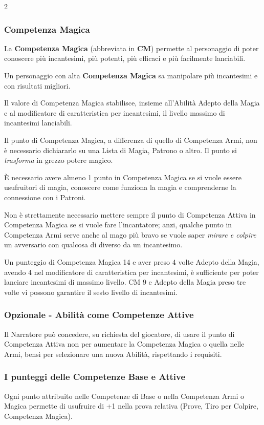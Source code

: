 \begin{multicols}{2}
\subsubsection{Competenza Magica}\label{competenzamagica}

La \textbf{Competenza Magica} (abbreviata in \textbf{CM}) permette al personaggio di poter conoscere più incantesimi, più potenti, più efficaci e più facilmente lanciabili.

Un personaggio con alta \textbf{Competenza Magica} sa manipolare più incantesimi e con risultati migliori.

Il valore di Competenza Magica stabilisce, insieme all'Abilità Adepto della Magia e al modificatore di caratteristica per incantesimi, il livello massimo di incantesimi lanciabili.

Il punto di Competenza Magica, a differenza di quello di Competenza Armi, non è necessario dichiararlo su una Lista di Magia, Patrono o altro. Il punto si \emph{trasforma} in grezzo potere magico.

È necessario avere almeno 1 punto in Competenza Magica se si vuole essere usufruitori di magia, conoscere come funziona la magia e comprenderne la connessione con i Patroni.

Non è strettamente necessario mettere sempre il punto di Competenza Attiva in Competenza Magica se si vuole fare l'incantatore; anzi, qualche punto in Competenza Armi serve anche al mago più bravo se vuole saper \emph{mirare e colpire} un avversario con qualcosa di diverso da un incantesimo.

Un punteggio di Competenza Magica 14 e aver preso 4 volte Adepto della Magia, avendo 4 nel modificatore di caratteristica per incantesimi, è sufficiente per poter lanciare incantesimi di massimo livello. CM 9 e Adepto della Magia preso tre volte vi possono garantire il sesto livello di incantesimi.

\subsubsection{Opzionale - Abilità come Competenze Attive}

Il Narratore può concedere, su richiesta del giocatore, di usare il punto di Competenza Attiva non per aumentare la Competenza Magica o quella nelle Armi, bensì per selezionare una nuova Abilità, rispettando i requisiti.

\subsubsection{I punteggi delle Competenze Base e Attive}\label{punteggicompetenzebaseattive}

Ogni punto attribuito nelle Competenze di Base o nella Competenza Armi o Magica permette di usufruire di +1 nella prova relativa (Prove, Tiro per Colpire, Competenza Magica).

\end{multicols}

